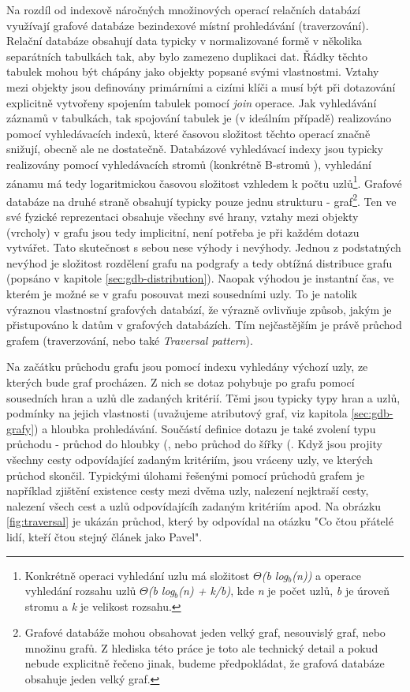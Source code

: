 Na rozdíl od indexově náročných množinových operací relačních databází využívají grafové databáze bezindexové místní prohledávání (traverzování).\cite{Anglels08} Relační databáze obsahují data typicky v normalizované formě v několika separátních tabulkách tak, aby bylo zamezeno duplikaci dat. Řádky těchto tabulek mohou být chápány jako objekty popsané svými vlastnostmi. Vztahy mezi objekty jsou definovány primárními a cizími klíči a musí být při dotazování explicitně vytvořeny spojením tabulek pomocí \textit{join} operace. Jak vyhledávání záznamů v tabulkách, tak spojování tabulek je (v ideálním případě) realizováno pomocí vyhledávacích indexů, které časovou složitost těchto operací značně snižují, obecně ale ne dostatečně. Databázové vyhledávací indexy jsou typicky realizovány pomocí vyhledávacích stromů (konkrétně B-stromů \cite{Leach05}), vyhledání zánamu má tedy logaritmickou časovou složitost vzhledem k počtu uzlů\footnote{Konkrétně operaci vyhledání uzlu má složitost \textit{$\Theta$(b log$_b$(n))} a operace vyhledání rozsahu uzlů \textit{$\Theta$(b log$_b$(n) + k/b)}, kde \textit{n} je počet uzlů, \textit{b} je úroveň stromu a \textit{k} je velikost rozsahu.\cite{Cormen09}}. 
Grafové databáze na druhé straně obsahují typicky pouze jednu strukturu - graf\footnote{Grafové databáže mohou obsahovat jeden velký graf, nesouvislý graf, nebo množinu grafů. Z hlediska této práce je toto ale technický detail a pokud nebude explicitně řečeno jinak, budeme předpokládat, že grafová databáze obsahuje jeden velký graf.}. Ten ve své fyzické reprezentaci obsahuje všechny své hrany, vztahy mezi objekty (vrcholy) v grafu jsou tedy implicitní, není potřeba je při každém dotazu vytvářet. Tato skutečnost s sebou nese výhody i nevýhody. Jednou z podstatných nevýhod je složitost rozdělení grafu na podgrafy a tedy obtížná distribuce grafu (popsáno v kapitole \ref{sec:gdb-distribution}). Naopak výhodou je instantní čas, ve kterém je možné se v grafu posouvat mezi sousedními uzly. To je natolik výraznou vlastnostní grafových databází, že výrazně ovlivňuje způsob, jakým je přistupováno k datům v grafových databázích. Tím nejčastějším je právě průchod grafem (traverzování, nebo také \textit{Traversal pattern}). 

Na začátku průchodu grafu jsou pomocí indexu vyhledány výchozí uzly, ze kterých bude graf procházen. Z nich se dotaz pohybuje po grafu pomocí sousedních hran a uzlů dle zadaných kritérií. Těmi jsou typicky typy hran a uzlů, podmínky na jejich vlastnosti (uvažujeme atributový graf, viz kapitola \ref{sec:gdb-grafy}) a hloubka prohledávání. Součástí definice dotazu je také zvolení typu průchodu - průchod do hloubky (\textit{}, nebo průchod do šířky (\textit{}. Když jsou projity všechny cesty odpovídající zadaným kritériím, jsou vráceny uzly, ve kterých průchod skončil. Typickými úlohami řešenými pomocí průchodů grafem je například zjištění existence cesty mezi dvěma uzly, nalezení nejktraší cesty, nalezení všech cest a uzlů odpovídajícíh zadaným kritériím apod. Na obrázku \ref{fig:traversal} je ukázán průchod, který by odpovídal na otázku "Co čtou přátelé lidí, kteří čtou stejný článek jako Pavel". 


